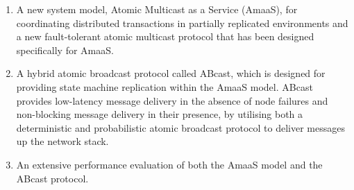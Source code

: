 	    \begin{enumerate}[label=\roman*]
	        
	        \item A new system model, Atomic Multicast as a Service (\textsf{AmaaS}), for coordinating distributed transactions in partially replicated environments and a new fault-tolerant atomic multicast protocol that has been designed specifically for \textsf{AmaaS}.  
	        
	        \item A hybrid atomic broadcast protocol called \textsf{ABcast}, which is designed for providing state machine replication within the \textsf{AmaaS} model.  \textsf{ABcast} provides low-latency message delivery in the absence of node failures and non-blocking message delivery in their presence, by utilising both a deterministic and probabilistic atomic broadcast protocol to deliver messages up the network stack.  
	        
	        \item An extensive performance evaluation of both the \textsf{AmaaS} model and the \textsf{ABcast} protocol.
	    \end{enumerate}
    
